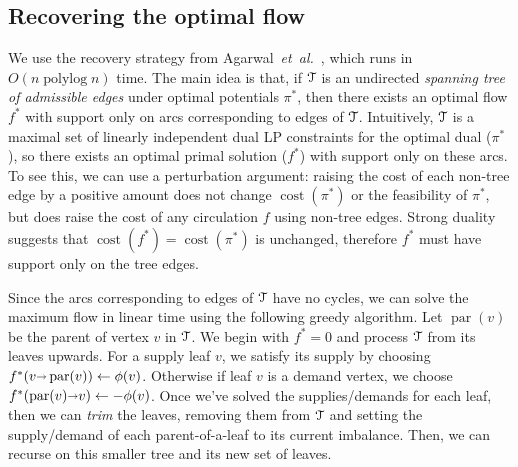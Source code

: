 \documentclass[a4paper,UKenglish]{socg-lipics-v2018}
\def\etal{\emph{et~al.}}
\def\etal{\textit{et~al.}}
\def\polylog{\mathop{\mathrm{polylog}}}
\def\fsupply{\phi}
\def\arcto{\mathord\shortrightarrow}
\def\arc#1#2{#1\arcto#2}
\def\cost{\operatorname{cost}}
\def\parent{\operatorname{par}}
\theoremstyle{plain}
\numberwithin{figure}{section}
\def\EMPH#1{\textcolor{BrickRed}{{\emph{#1}}}}
\begin{document}
\begin{toappendix}

\subsection{Recovering the optimal flow}
\label{SSA:flow-recovery}

We use the recovery strategy from Agarwal~\etal~\cite{AFPVX17}, which runs in
$O(n\polylog n)$ time.
The main idea is that, if $\EuScript{T}$ is an undirected \emph{spanning tree of admissible edges}
under optimal potentials $\pi^*$, then there exists an optimal flow $f^*$ with
support only on arcs corresponding to edges of $\EuScript{T}$.
Intuitively, $\EuScript{T}$ is a maximal set of linearly independent dual LP
constraints for the optimal dual ($\pi^*$), so there exists an optimal primal
solution ($f^*$) with support only on these arcs.
To see this, we can use a perturbation argument: raising the cost of each
non-tree edge by a positive amount does not change $\cost(\pi^*)$ or the feasibility
of $\pi^*$, but does raise the cost of any circulation $f$ using non-tree edges.
Strong duality suggests that $\cost(f^*) = \cost(\pi^*)$ is unchanged,
therefore $f^*$ must have support only on the tree edges.

Since the arcs corresponding to edges of $\EuScript{T}$ have no cycles, we can
solve the maximum flow in linear time using the following greedy algorithm.
Let $\parent(v)$ be the parent of vertex $v$ in $\EuScript{T}$.
We begin with $f^* = 0$ and process $\EuScript{T}$ from its leaves upwards.
For a supply leaf $v$, we satisfy its supply by choosing
$f^*(\arc{v}{\parent(v)}) \gets \fsupply(v)$.
Otherwise if leaf $v$ is a demand vertex, we choose
$f^*(\arc{\parent(v)}{v}) \gets -\fsupply(v)$.
Once we've solved the supplies/demands for each leaf, then we can \EMPH{trim}
the leaves, removing them from $\EuScript{T}$ and setting the supply/demand
of each parent-of-a-leaf to its current imbalance.
Then, we can recurse on this smaller tree and its new set of leaves.


\end{toappendix}
\end{document}
